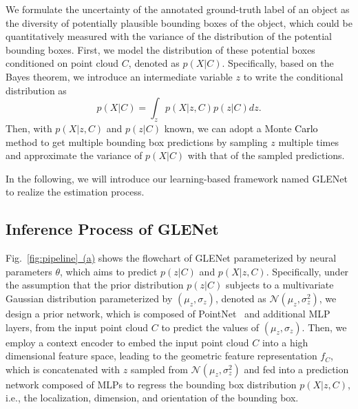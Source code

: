 \documentclass[twocolumn]{svjour3}
\newcommand{\revise}[1]{\textcolor{black}{#1}}
\begin{document}
We formulate the uncertainty of the annotated ground-truth label of an object as the diversity of potentially plausible bounding boxes of the object, which could be quantitatively measured with the variance of the distribution of the potential bounding boxes.
First, we model 
the distribution of these potential boxes conditioned on point cloud $C$, denoted as $p(X \vert C)$.  
Specifically, 
based on the Bayes theorem, we introduce an intermediate variable $z$ to write the conditional distribution as 
\begin{equation}
  p(X \vert C)=\int_{z}p(X \vert z,C)p(z \vert C)dz.
\end{equation}
Then, with $p(X \vert z,C)$ and $p(z\vert C)$ known, we can adopt a Monte \revise{Carlo} method to get multiple bounding box predictions by sampling $z$ multiple times and approximate the variance of $p(X \vert C)$ with that of the sampled predictions. 

In the following, we will introduce our learning-based framework named GLENet to realize the estimation process. 

\subsection{Inference Process of GLENet}
Fig.~\hyperref[fig:pipeline]{\ref{fig:pipeline}~(a)} shows the flowchart of GLENet parameterized by neural parameters $\theta$, which aims to predict $p(z \vert C)$ and $p(X \vert z,C)$. 
Specifically, under the assumption that the prior distribution $p(z \vert C)$ subjects to a multivariate Gaussian distribution parameterized by $(\mu_z,\sigma_z)$, denoted as $\mathcal{N}(\mu_{z}, \sigma_{z}^{2})$, we design a prior network, which is composed of PointNet~\citep{qi2017pointnet} and additional MLP layers, from the input point cloud $C$ to predict the values of $(\mu_z,\sigma_z)$. 
Then, we employ a context encoder to embed the input point cloud $C$ into a high dimensional feature space, leading to the geometric feature representation $f_{C}$, which is concatenated with $z$ sampled from $\mathcal{N}(\mu_{z}, \sigma_{z}^{2})$ and fed into a prediction network composed of MLPs to regress the bounding box distribution $p(X \vert z,C)$, i.e., the localization, dimension, and orientation of the bounding box.   
\end{document}
